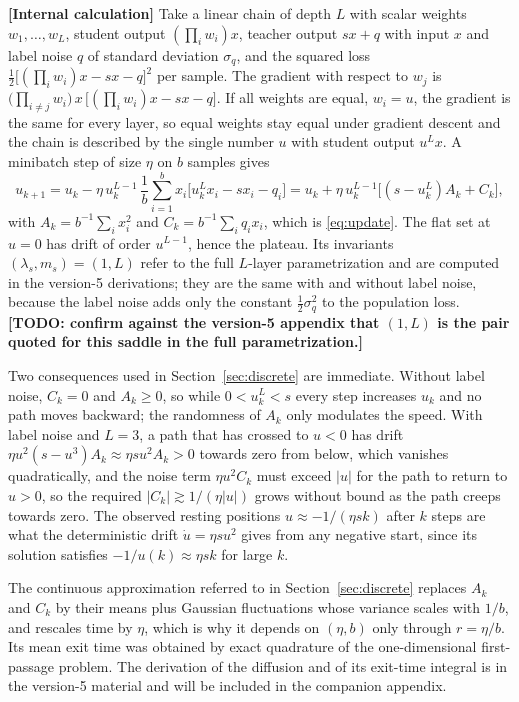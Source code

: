 \documentclass[11pt,a4paper]{article}
\newcommand{\evl}[2]{{\small\bfseries\color{#1}[#2]}}
\newcommand{\LCalc}{\evl{ccalc}{Internal calculation}}
\begin{document}
\LCalc{} Take a linear chain of depth $L$ with scalar weights
$w_1,\dots,w_L$, student output $(\prod_iw_i)x$, teacher output $sx+q$ with
input $x$ and label noise $q$ of standard deviation $\sigma_q$, and the
squared loss $\tfrac12\bigl[(\prod_iw_i)x-sx-q\bigr]^2$ per sample. The
gradient with respect to $w_j$ is
$\bigl(\prod_{i\ne j}w_i\bigr)\,x\,\bigl[(\prod_iw_i)x-sx-q\bigr]$. If all
weights are equal, $w_i=u$, the gradient is the same for every layer, so
equal weights stay equal under gradient descent and the chain is described
by the single number $u$ with student output $u^Lx$. A minibatch step of
size $\eta$ on $b$ samples gives
\begin{equation}
u_{k+1}=u_k-\eta\,u_k^{L-1}\,\frac1b\sum_{i=1}^b x_i\bigl[u_k^Lx_i-sx_i-q_i\bigr]
=u_k+\eta\,u_k^{L-1}\bigl[(s-u_k^L)A_k+C_k\bigr],
\end{equation}
with $A_k=b^{-1}\sum_ix_i^2$ and $C_k=b^{-1}\sum_iq_ix_i$, which is
\eqref{eq:update}. The flat set at $u=0$ has drift of order $u^{L-1}$,
hence the plateau. Its invariants $(\lambda_s,m_s)=(1,L)$ refer to the full
$L$-layer parametrization and are computed in the version-5 derivations;
they are the same with and without label noise, because the label noise
adds only the constant $\tfrac12\sigma_q^2$ to the population loss.
\textbf{[TODO: confirm against the version-5 appendix that $(1,L)$ is the
pair quoted for this saddle in the full parametrization.]}

Two consequences used in Section~\ref{sec:discrete} are immediate. Without
label noise, $C_k=0$ and $A_k\ge0$, so while $0<u_k^L<s$ every step
increases $u_k$ and no path moves backward; the randomness of $A_k$ only
modulates the speed. With label noise and $L=3$, a path that has crossed to
$u<0$ has drift $\eta u^2(s-u^3)A_k\approx\eta su^2A_k>0$ towards zero from
below, which vanishes quadratically, and the noise term $\eta u^2C_k$ must
exceed $|u|$ for the path to return to $u>0$, so the required
$|C_k|\gtrsim1/(\eta|u|)$ grows without bound as the path creeps towards
zero. The observed resting positions $u\approx-1/(\eta sk)$ after $k$ steps
are what the deterministic drift $\dot u=\eta su^2$ gives from any negative
start, since its solution satisfies $-1/u(k)\approx\eta sk$ for large $k$.

The continuous approximation referred to in Section~\ref{sec:discrete}
replaces $A_k$ and $C_k$ by their means plus Gaussian fluctuations whose
variance scales with $1/b$, and rescales time by $\eta$, which is why it
depends on $(\eta,b)$ only through $r=\eta/b$. Its mean exit time was
obtained by exact quadrature of the one-dimensional first-passage problem.
The derivation of the diffusion and of its exit-time integral is in the
version-5 material and will be included in the companion appendix.
\end{document}
